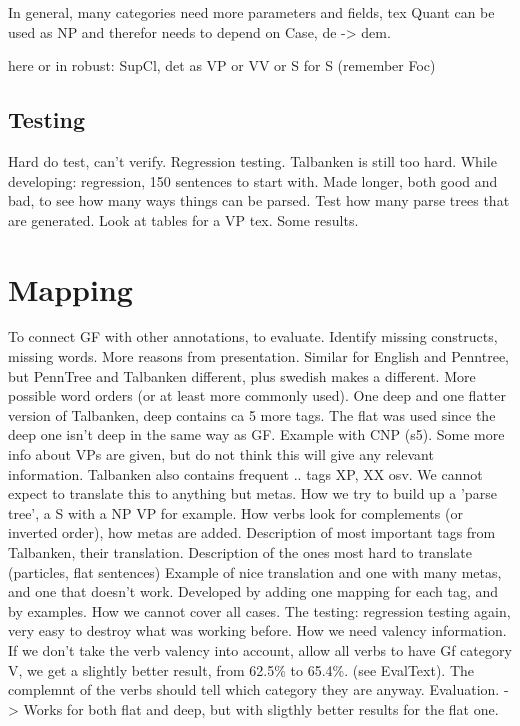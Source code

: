 \documentclass{report}
\begin{document}
In general, many categories need more parameters and fields, tex Quant can be used as NP
and therefor needs to depend on Case, de -> dem.

here or in robust: SupCl, det as VP or VV or S for S (remember Foc)

\subsection{Testing}
Hard do test, can't verify. Regression testing. Talbanken is still too hard.
While developing: regression, 150 sentences to start with. Made longer, both good and bad,
to see how many ways things can be parsed.
Test how many parse trees that are generated.
Look at tables for a VP tex.
Some results.


\section{Mapping}
\label{sec:Mapping}
To connect GF with other annotations, to evaluate. Identify missing constructs,
missing words. More reasons from presentation.
Similar for English and Penntree, but PennTree and Talbanken different, plus swedish
makes a different. More possible word orders (or at least more commonly used).
One deep and one flatter version of Talbanken, deep contains ca 5 more tags.
The flat was used since the deep one
isn't deep in the same way as GF. Example with CNP (s5). Some
more info about VPs are given, but do not think this will give any relevant information.
Talbanken also contains frequent .. tags XP, XX osv. We cannot expect to translate
this to anything but metas.
How we try to build up a 'parse tree', a S with a NP VP for example. 
How verbs look for complements (or inverted order), how metas are added.
Description of most important tags from Talbanken, their translation.
Description of the ones most hard to translate (particles, flat sentences)
Example of nice translation and one with many metas, and one that doesn't work.
Developed by adding one mapping for each tag, and by examples.
How we cannot cover all cases. The testing: regression testing again,
very easy to destroy what was working before. 
How we need valency information.
If we don't take the verb valency into account, allow all verbs to have Gf category V,
we get a slightly better result,
from 62.5\% to 65.4\%.  (see EvalText). The complemnt of the verbs should tell which category
they are anyway.
Evaluation. -> Works for both flat and deep, but with sligthly better results for the flat one.
\end{document}
